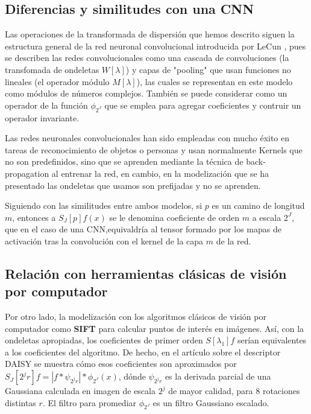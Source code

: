 \subsection{Diferencias y similitudes con una CNN}


Las operaciones de la transformada de dispersión que hemos descrito siguen la estructura general de la red neuronal convolucional introducida por LeCun \cite{lecun2015deep}, pues se describen las redes convolucionales como una cascada de convoluciones (la transfomada de ondeletas $W[\lambda]$) y capas de "pooling" que usan funciones no lineales (el operador módulo $M[\lambda]$), las cuales se representan en este modelo como módulos de números complejos. También se puede considerar como un operador de  la función $\phi_{2^J}$ que se emplea para agregar coeficientes y contruir un operador invariante.

\medskip

\noindent Las redes neuronales convolucionales han sido empleadas con mucho éxito en tareas de reconocimiento de objetos o personas y usan normalmente Kernels que no son predefinidos, sino que se aprenden mediante la técnica de back-propagation al entrenar la red, en cambio, en la modelización que se ha presentado las ondeletas que usamos son prefijadas y no se aprenden.

\medskip

\noindent Siguiendo con las similitudes entre ambos modelos, si $p$ es un camino de longitud $m$, entonces a $S_J[p] f(x)$ se le denomina coeficiente de orden $m$ a escala $2^J$, que en el caso de una CNN,equivaldría al tensor formado por los mapas de activación tras la convolución con el kernel de la capa $m$ de la red. 

\medskip


\subsection{Relación con herramientas clásicas de visión por computador}
\noindent Por otro lado, la modelización  con los algoritmos clásicos de visión por computador como \textbf{SIFT}  \cite{DistinctiveImageFeatures} para calcular puntos de interés en imágenes. Así, con la ondeletas apropiadas, los coeficientes de primer orden $S[\lambda_1] f$ serían equivalentes a los coeficientes del algoritmo. De hecho, en el artículo sobre el descriptor DAISY \cite{Daisy} se muestra cómo esos coeficientes son aproximados por $S_J[2^j r] f= | f \ast \psi_{2^j r} | \ast \phi_{2^J}(x)$, dónde $\psi_{2^j r}$ es la derivada parcial de una Gaussiana calculada en imagen de escala $2^j$ de mayor calidad, para 8 rotaciones distintas $r$. El filtro para promediar $\phi_{2^J}$ es un filtro Gaussiano escalado.


